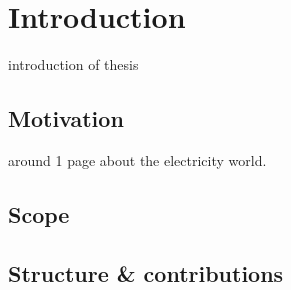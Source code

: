 \chapter{Introduction}
introduction of thesis

\section{Motivation}
around 1 page about the electricity world. 

\section{Scope}

\section{Structure \& contributions}



